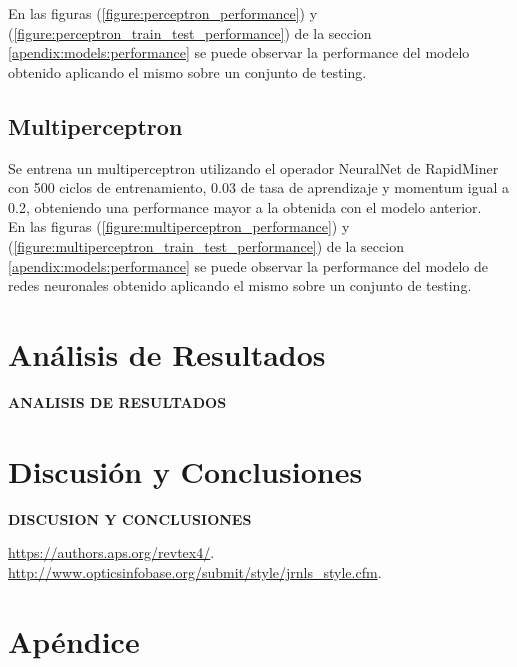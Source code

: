 \documentclass[osajnl,twocolumn,showpacs,superscriptaddress,10pt,floatfix]{revtex4-1} %
\begin{document}
En las figuras (\ref{figure:perceptron_performance}) y (\ref{figure:perceptron_train_test_performance}) de la seccion \ref{apendix:models:performance} se puede observar la performance del modelo obtenido aplicando el mismo sobre un conjunto de testing. \\

\subsection{Multiperceptron}

Se entrena un multiperceptron utilizando el operador NeuralNet de RapidMiner con 500 ciclos de entrenamiento, 0.03 de tasa de aprendizaje y momentum igual a 0.2, obteniendo una performance mayor a la obtenida con el modelo anterior. \\

En las figuras (\ref{figure:multiperceptron_performance}) y (\ref{figure:multiperceptron_train_test_performance}) de la seccion \ref{apendix:models:performance} se puede observar la performance del modelo de redes neuronales obtenido aplicando el mismo sobre un conjunto de testing. \\

\section{Análisis de Resultados}

\textbf{ANALISIS DE RESULTADOS}

\section{Discusión y Conclusiones}

\textbf{DISCUSION Y CONCLUSIONES}

\begin{thebibliography}{99}

 \url{https://authors.aps.org/revtex4/}.
 \url{http://www.opticsinfobase.org/submit/style/jrnls_style.cfm}.

\end{thebibliography}

\clearpage

\onecolumngrid

\section{Apéndice}
\end{document}
